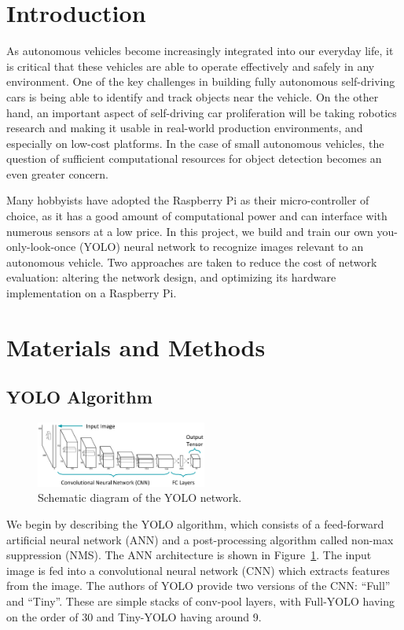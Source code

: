\documentclass{article}
\begin{document}
\section{Introduction}
As autonomous vehicles become increasingly integrated into our everyday life, it is critical that these vehicles are able to operate effectively and safely in any environment. One of the key challenges in building fully autonomous self-driving cars is being able to identify and track objects near the vehicle. On the other hand, an important aspect of self-driving car proliferation will be taking robotics research and making it usable in real-world production environments, and especially on low-cost platforms. In the case of small autonomous vehicles, the question of sufficient computational resources for object detection becomes an even greater concern. 

Many hobbyists have adopted the Raspberry Pi as their micro-controller of choice, as it has a good amount of computational power and can interface with numerous sensors at a low price. In this project, we build and train our own you-only-look-once (YOLO) neural network to recognize images relevant to an autonomous vehicle. Two approaches are taken to reduce the cost of network evaluation: altering the network design, and optimizing its hardware implementation on a Raspberry Pi.

\section{Materials and Methods}
\label{materials_and_methods}

\subsection{YOLO Algorithm}

\begin{figure}[t]
  \centering
  \includegraphics[width=0.5\textwidth]{yolo_diagram}
  \caption{Schematic diagram of the YOLO network.}
  \label{fig:yolo}
\end{figure}

We begin by describing the YOLO algorithm, which consists of a feed-forward artificial neural network (ANN) and a post-processing algorithm called non-max suppression (NMS). The ANN architecture is shown in Figure~\ref{fig:yolo}. The input image is fed into a convolutional neural network (CNN) which extracts features from the image. The authors of YOLO provide two versions of the CNN: ``Full'' and ``Tiny''. These are simple stacks of conv-pool layers, with Full-YOLO having on the order of 30 and Tiny-YOLO having around 9.
\end{document}
